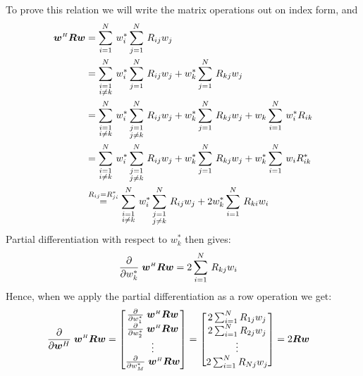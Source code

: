 To prove this relation we will write the matrix operations out on index form, and 
%
\begin{align}
\boldsymbol{w}^{\scriptscriptstyle H}\boldsymbol{R}\boldsymbol{w} &= \sum\limits_{i=1}^{N}\,w_i^* \sum\limits_{j=1}^{N}\,  R_{ij} w_j \nonumber\\
&= \sum\limits_{\substack{i=1\\i\ne k}}^{N}\, w_i^* \sum\limits_{j=1}^{N}\, R_{ij} w_j + w_k^*\sum\limits_{j=1}^{N}\, R_{kj} w_j \nonumber\\
&= \sum\limits_{\substack{i=1\\i\ne k}}^{N}\, w_i^* \sum\limits_{\substack{j=1\\j\ne k}}^{N}\, R_{ij} w_j + w_k^*\sum\limits_{j=1}^{N}\, R_{kj} w_j + w_k\sum\limits_{i=1}^{N}\,w_i^* R_{ik} \nonumber\\
&= \sum\limits_{\substack{i=1\\i\ne k}}^{N}\, w_i^* \sum\limits_{\substack{j=1\\j\ne k}}^{N}\, R_{ij} w_j + w_k^*\sum\limits_{j=1}^{N}\, R_{kj} w_j + w_k^*\sum\limits_{i=1}^{N}\,w_i R_{ik}^* \nonumber\\
&\overset{R_{ij}=R_{ji}^*}{=} \sum\limits_{\substack{i=1\\i\ne k}}^{N}\, w_i^* \sum\limits_{\substack{j=1\\j\ne k}}^{N}\, R_{ij} w_j + 2w_k^*\sum\limits_{i=1}^{N}\, R_{ki} w_i
\end{align}
%
Partial differentiation with respect to $w_k^*$ then gives:
%
\begin{align}
\frac{\partial}{\partial w_k^*}\;\boldsymbol{w}^{\scriptscriptstyle H}\boldsymbol{R}\boldsymbol{w}
&= 2\sum\limits_{i=1}^{N}\, R_{kj} w_i
\end{align}
%
Hence, when we apply the partial differentiation as a row operation we get:
%
\begin{align}
\frac{\partial}{\partial \boldsymbol{w}^H}\;\boldsymbol{w}^{\scriptscriptstyle H}\boldsymbol{R}\boldsymbol{w}
&= \begin{bmatrix}
\frac{\partial}{\partial w_1^*}\;\boldsymbol{w}^{\scriptscriptstyle H}\boldsymbol{R}\boldsymbol{w} \\
\frac{\partial}{\partial w_2^*}\;\boldsymbol{w}^{\scriptscriptstyle H}\boldsymbol{R}\boldsymbol{w} \\ \vdots \\
\frac{\partial}{\partial w_M^*}\;\boldsymbol{w}^{\scriptscriptstyle H}\boldsymbol{R}\boldsymbol{w}\end{bmatrix}
= \begin{bmatrix}
2\sum_{i=1}^{N} R_{1j} w_j\\
2\sum_{i=1}^{N} R_{2j} w_j\\ \vdots \\
2\sum_{i=1}^{N} R_{Nj} w_j\end{bmatrix}
= 2\boldsymbol{R}\boldsymbol{w}
\end{align}